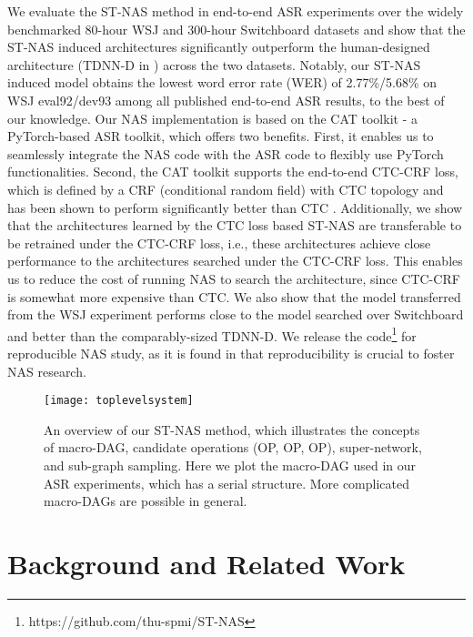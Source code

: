 \documentclass{article}
\begin{document}
We evaluate the ST-NAS method in end-to-end ASR experiments over the widely benchmarked 80-hour WSJ and 300-hour Switchboard datasets and show that the ST-NAS induced architectures significantly outperform the human-designed architecture (TDNN-D in \cite{peddinti2018low}) across the two datasets.
Notably, our ST-NAS induced model obtains the lowest word error rate (WER) of 2.77\%/5.68\% on WSJ eval92/dev93 among all published end-to-end ASR results, to the best of our knowledge.
Our NAS implementation is based on the CAT toolkit \cite{an2020cat} - a PyTorch-based ASR toolkit, which offers two benefits. First, it enables us to seamlessly integrate the NAS code with the ASR code to flexibly use PyTorch functionalities. Second, the CAT toolkit supports the end-to-end CTC-CRF loss, which is defined by a CRF (conditional random field) with CTC topology and has been shown to perform significantly better than CTC \cite{xiang2019crf, an2020cat}.
Additionally, we show that the architectures learned by the CTC loss based ST-NAS are transferable to be retrained under the CTC-CRF loss, i.e., these architectures achieve close performance to the architectures searched under the CTC-CRF loss. This enables us to reduce the cost of running NAS to search the architecture, since CTC-CRF is somewhat more expensive than CTC.
We also show that the model transferred from the WSJ experiment performs close to the model searched over Switchboard and better than the comparably-sized TDNN-D.
We release the code\footnote{https://github.com/thu-spmi/ST-NAS} for reproducible NAS study, as it is found in \cite{Li2019Random} that reproducibility is crucial to foster NAS research.

\begin{figure}[t]
    \centering
    \texttt{[image: toplevelsystem]}
    \vspace{-3mm}
    \caption{An overview of our ST-NAS method, which illustrates the concepts of macro-DAG, candidate operations (OP, OP, OP), super-network, and sub-graph sampling.
        Here we plot the macro-DAG used in our ASR experiments, which has a serial structure. More complicated macro-DAGs are possible in general.
    }
    \label{fig:toplevelsystem}
\end{figure}

\section{Background and Related Work}
\label{sec:relatedwork}
\end{document}
